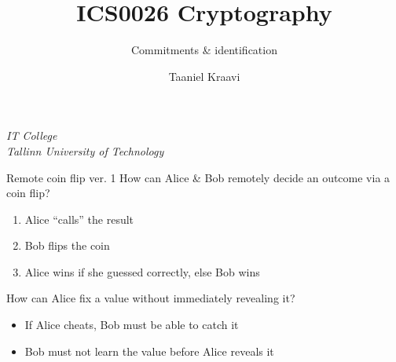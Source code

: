 

\usepackage[dvipsnames]{xcolor}

\usepackage{booktabs}

\usepackage{fancyvrb}

\usepackage{csquotes}

\usepackage{graphicx}
\graphicspath{ {../../images/} }

\usepackage{pgfplots}
\usetikzlibrary{positioning,calc,external}

\usepackage{crysymb}

\renewcommand*{\arraystretch}{1.2}

\usepackage{soul}
\usepackage[en-GB]{datetime2}

\usetikzlibrary{positioning,calc}
\graphicspath{ {../../images/} }

\title{ICS0026 Cryptography}
\subtitle{Commitments \& identification}
\date{}
\author{Taaniel Kraavi}
\institute%
{%
  \textit{IT College}\\
  \textit{Tallinn University of Technology}
}


\begin{frame}
  \titlepage
\end{frame}

\begin{frame}{Remote coin flip ver. 1}
  How can Alice \& Bob remotely decide an outcome via a coin flip?
  \begin{enumerate}[<+(1)->]
    \item Alice \enquote{calls} the result
    \item Bob flips the coin
    \item Alice wins if she guessed correctly, else Bob wins
  \end{enumerate}

  \vspace*{1em}

  \pause
  How can Alice fix a value without immediately revealing it? 
  \begin{itemize}[<+(1)->]
    \item If Alice cheats, Bob must be able to catch it
    \item Bob must not learn the value before Alice reveals it
  \end{itemize}
\end{frame}

